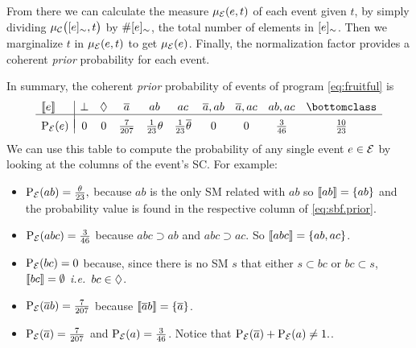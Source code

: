 \documentclass{article}
\begin{document}
From there we can calculate the
measure \(\pwe{e, t}\) of each event given \(t\), by simply
dividing \(\pwc{\class{e}, t}\) by \(\#[{e}]_{\sim}\), the total
number of elements in \([{e}]_{\sim}\).  Then we marginalize \(t\) in
\(\pwe{e, t}\) to get \(\pwe{e}\).  Finally, the normalization
factor provides a coherent \emph{prior}
probability for each event.

In summary, the coherent \emph{prior} probability of events of
program \cref{eq:fruitful} is
\begin{equation}
	\begin{array}{l|ccccccccc}
		\stablecore{e}          &
		\inconsistent           &
		\indepclass             &
		\co{a}                  &
		ab                      &
		ac                      &
		\co{a}, ab              &
		\co{a}, ac              &
		ab, ac                  &
		\bottomclass              \\

		\hline                    \\[-8pt]

		\prE\at{e}              &
		0                       &
		0                       &
		\frac{7}{207}           &
		\frac{1}{23}\theta      &
		\frac{1}{23}\co{\theta} &
		0                       &
		0                       &
		\frac{3}{46}            &
		\frac{10}{23}
	\end{array}
\end{equation}\label{eq:sbf.prior}
We can use this table to compute the probability
    of any single event \(e \in {\cal E}\) by looking
    at the columns of the event's \acl{SC}. For example:
	\begin{itemize}
		\item \(\prE\at{ab} = \frac{\theta}{23}, \) because \(ab\) is the only \ac{SM} related with \(ab\) so \(\left\llbracket ab \right\rrbracket = \set{ab}\) and the probability value is found in the respective column of \cref{eq:sbf.prior}.

		\item \(\prE\at{abc} = \frac{3}{46}\) because \(abc \supset  ab\) and \(abc \supset ac\). So \(\left\llbracket abc \right\rrbracket = \set{ab, ac}\).

		\item \(\prE\at{bc} = 0\) because, since there is no \ac{SM} \(s\) that either \(s \subset bc\) or \(bc \subset s\), \(\left\llbracket bc \right\rrbracket = \emptyset\) \emph{i.e.}\ \(bc \in \Diamond\).

		\item \(\prE\at{\co{a}b} = \frac{7}{207}\) because \(\left\llbracket \overline{a}b \right\rrbracket = \set{\ensuremath{\overline{a}}}\).

		\item \(\prE\at{\co{a}} = \frac{7}{207}\) and  \(\prE\at{a} = \frac{3}{46}\). Notice that
			      \( \prE\at{\co{a}} + \prE\at{a} \not= 1. \).
	\end{itemize}
\end{document}
